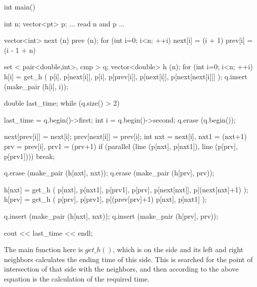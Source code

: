 int main() {
int n;
vector<pt> p;
... read n and p ...

vector<int> next (n) prev (n);
for (int i=0; i<n; ++i) {
next[i] = (i + 1) %
prev[i] = (i - 1 + n) %
}

set < pair<double,int>, cmp > q;
vector<double> h (n);
for (int i=0; i<n; ++i) {
h[i] = get_h (
p[i], p[next[i]],
p[i], p[prev[i]],
p[next[i]], p[next[next[i]]]
);
q.insert (make_pair (h[i], i));
}

double last_time;
while (q.size() > 2) {
last_time = q.begin()->first;
int i = q.begin()->second;
q.erase (q.begin());

next[prev[i]] = next[i];
prev[next[i]] = prev[i];
int nxt = next[i], nxt1 = (nxt+1)%
prv = prev[i], prv1 = (prv+1)%
if (parallel (line (p[nxt], p[nxt1]), line (p[prv], p[prv1])))
break;

q.erase (make_pair (h[nxt], nxt));
q.erase (make_pair (h[prv], prv));

h[nxt] = get_h (
p[nxt], p[nxt1],
p[prv1], p[prv],
p[next[nxt]], p[(next[nxt]+1)%
);
h[prv] = get_h (
p[prv], p[prv1],
p[(prev[prv]+1)%
p[nxt], p[nxt1]
);

q.insert (make_pair (h[nxt], nxt));
q.insert (make_pair (h[prv], prv));
}

cout << last_time << endl;
}
\endcode

The main function here is $get\_h()$, which is on the side and its left and right neighbors calculates the ending time of this side. This is searched for the point of intersection of that side with the neighbors, and then according to the above equation is the calculation of the required time.
